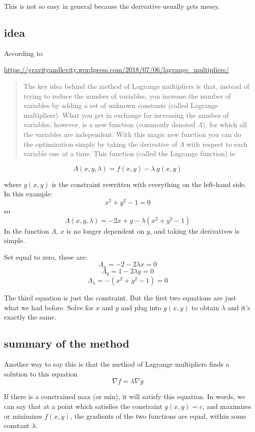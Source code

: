 \documentclass[11pt, oneside]{article}
\begin{document}
This is not so easy in general because the derivative usually gets messy.

\subsection*{idea}
According to 

\url{https://gravityandlevity.wordpress.com/2018/07/06/lagrange_multipliers/}

\begin{quote} The key idea behind the method of Lagrange multipliers is that, instead of trying to reduce the number of variables, you increase the number of variables by adding a set of unknown constants (called Lagrange multipliers). What you get in exchange for increasing the number of variables, however, is a new function (commonly denoted $\Lambda$), for which all the variables are independent. With this magic new function you can do the optimization simply by taking the derivative of $\Lambda$ with respect to each variable one at a time. This function (called the Lagrange function) is:\end{quote}

\[ \Lambda(x,y,\lambda) = f(x,y) - \lambda \ g(x,y) \]

where $g(x,y)$ is the constraint rewritten with everything on the left-hand side.  In this example:
\[ x^2 + y^2 - 1 = 0 \]
so
\[ \Lambda(x,y,\lambda) = -2x + y - \lambda (x^2 + y^2 - 1) \]
In the function $\Lambda$, $x$ is no longer dependent on $y$, and taking the derivatives is simple.

Set equal to zero, these are:
\[ \Lambda_x = -2 - 2\lambda x = 0 \]
\[ \Lambda_y = 1 - 2\lambda y = 0 \]
\[ \Lambda_\lambda = - (x^2 + y^2 - 1) = 0 \]

The third equation is just the constraint.  But the first two equations are just what we had before.  Solve for $x$ and $y$ and plug into $g(x,y)$ to obtain $\lambda$ and it's exactly the same.

\subsection*{summary of the method}

Another way to say this is that the method of Lagrange multipliers finds a solution to this equation
\[ \nabla f = \lambda \nabla g \]

If there is a constrained max (or min), it will satisfy this equation.  In words, we can say that at a point which satisfies the constraint $g(x,y) = c$, and maximizes or minimizes $f(x,y)$, the gradients of the two functions are equal, within some constant $\lambda$. 
\end{document}
